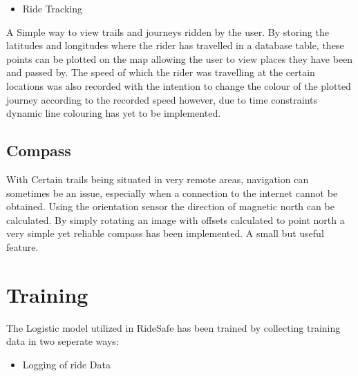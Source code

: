 \begin{itemize}
\item Ride Tracking
\end{itemize}
A Simple way to view trails and journeys ridden by the user. By storing the latitudes and longitudes where the rider has travelled in a database table, these points can be plotted on the map allowing the user to view places they have been and passed by. The speed of which the rider was travelling at the certain locations was also recorded with the intention to change the colour of the plotted journey according to the recorded speed however, due to time constraints dynamic line colouring has yet to be implemented.





\subsection{Compass}





With Certain trails being situated in very remote areas, navigation can sometimes be an issue, especially when a connection to the internet cannot be obtained. Using the orientation sensor the direction of magnetic north can be calculated. By simply rotating an image with offsets calculated to point north a very simple yet reliable compass has been implemented. A small but useful feature.








\section{Training}



The Logistic model utilized in RideSafe has been trained by collecting training data in two seperate ways:
\begin{itemize}
\item Logging of ride Data 
\end {itemize}

